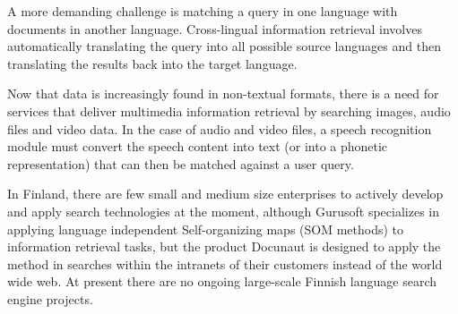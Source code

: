 \documentclass[]{../../metanetpaper}
\begin{document}
\begin{Parallel}[c]{77mm}{77mm}
{A more demanding challenge is matching a query in one language with
documents in another language. Cross-lingual information retrieval
involves automatically translating the query into all possible source
languages and then translating the results back into the target
language.

Now that data is increasingly found in non-textual formats, there is a
need for services that deliver multimedia information retrieval by
searching images, audio files and video data. In the case of audio and
video files, a speech recognition module must convert the speech
content into text (or into a phonetic representation) that can then be
matched against a user query.

In Finland, there are few small and medium size enterprises to actively develop and apply search
technologies at the moment, although Gurusoft specializes in applying
language independent Self-organizing maps (SOM methods) to information
retrieval tasks, but the product Docunaut is designed to apply the method in searches within the intranets of their customers instead of the world wide web. At present
there are no ongoing large-scale Finnish language search engine
projects.



}

\ParallelPar


\end{Parallel}
\end{document}
